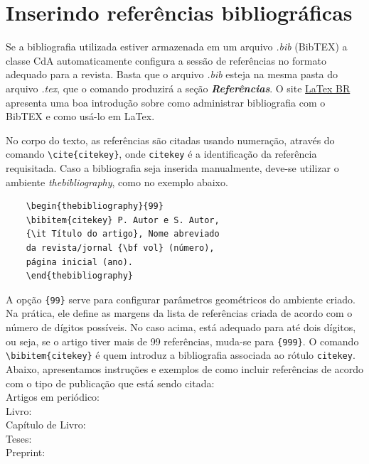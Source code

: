 \documentclass{cda}
\begin{document}
\section*{Inserindo referências bibliográficas}
Se a bibliografia utilizada estiver armazenada em um arquivo \textit{.bib} (BibTEX) a classe CdA automaticamente configura a sessão de referências no formato adequado para a revista. Basta que o arquivo \textit{.bib} esteja na mesma pasta do arquivo \textit{.tex}, que o comando \verb|| produzirá a seção \textit{\textbf{Referências}}. O site \href{http://latexbr.blogspot.com/2012/09/bibliografia-com-bibtex.html}{LaTex BR} apresenta uma boa introdução sobre como administrar bibliografia com o BibTEX e como usá-lo em LaTex.

No corpo do texto, as referências são citadas usando numeração, através do comando \verb|\cite{citekey}|, onde \verb|citekey| é a identificação da referência requisitada. Caso a bibliografia seja inserida manualmente, deve-se utilizar o ambiente \textit{thebibliography}, como no exemplo abaixo.
\begin{verbatim}
	\begin{thebibliography}{99}
	\bibitem{citekey} P. Autor e S. Autor,
	{\it Título do artigo},	Nome abreviado
	da revista/jornal {\bf vol} (número),
	página inicial (ano).
	\end{thebibliography}
\end{verbatim}
A opção \verb|{99}| serve para configurar parâmetros geométricos do ambiente criado. Na prática, ele define as margens da lista de referências criada de acordo com o número de dígitos possíveis. No caso acima, está adequado para até dois dígitos, ou seja, se o artigo tiver mais de 99 referências, muda-se para \verb|{999}|. O comando \verb|\bibitem{citekey}| é quem introduz a bibliografia associada ao rótulo \verb|citekey|.
Abaixo, apresentamos instruções e exemplos de como incluir referências de acordo com o tipo de publicação que está sendo citada:\\
Artigos em periódico: \cite{CdA:art,Fabris:2009wa}\\
Livro: \cite{CdA:livro,Weinberg1972gcpa}\\
Capítulo de Livro: \cite{CdA:proc,Toniato:2016sma}\\
Teses: \cite{CdA:tese,Clifton:2006jh}\\
Preprint: \cite{CdA:preprint,jimnez2020anisotropic}


{} 
\end{document}
